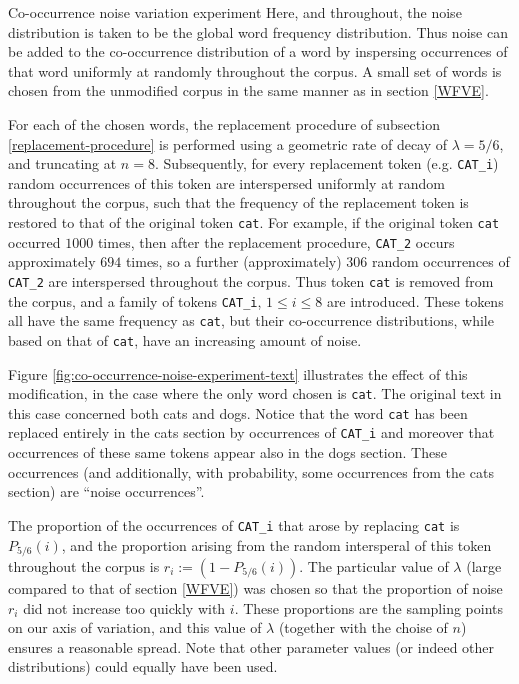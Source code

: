 \documentclass{article} %
\newcommand{\word}[1]{\texttt{#1}}
\begin{document}
\begin{section}{Co-occurrence noise variation experiment}\label{CNVE}
Here, and throughout, the noise distribution is taken to be the global word frequency distribution.
Thus noise can be added to the co-occurrence distribution of a word by inspersing occurrences of that word uniformly at randomly throughout the corpus.
A small set of words is chosen from the unmodified corpus in the same manner as in section \ref{WFVE}.

For each of the chosen words, the replacement procedure of subsection \ref{replacement-procedure} is performed using a geometric rate of decay of $\lambda = 5/6$, and truncating at $n=8$.
Subsequently, for every replacement token (e.g. \word{CAT\_i}) random occurrences of this token are interspersed uniformly at random throughout the corpus, such that the frequency of the replacement token is restored to that of the original token \word{cat}.
For example, if the original token \word{cat} occurred $1000$ times, then after the replacement procedure, \word{CAT\_2} occurs approximately $694$ times, so a further (approximately) $306$ random occurrences of \word{CAT\_2} are interspersed throughout the corpus.
Thus token \word{cat} is removed from the corpus, and a family of tokens \word{CAT\_i}, $1 \leqslant i \leqslant 8$ are introduced.
These tokens all have the same frequency as \word{cat}, but their co-occurrence distributions, while based on that of \word{cat}, have an increasing amount of noise.

Figure \ref{fig:co-occurrence-noise-experiment-text} illustrates the effect of this modification, in the case where the only word chosen is \word{cat}.
The original text in this case concerned both cats and dogs.
Notice that the word \word{cat} has been replaced entirely in the cats section by occurrences of \word{CAT\_i} and moreover that occurrences of these same tokens appear also in the dogs section. These occurrences (and additionally, with probability, some occurrences from the cats section) are ``noise occurrences''.

The proportion of the occurrences of \word{CAT\_i} that arose by replacing \word{cat} is $P_{5/6}(i)$, and the proportion arising from the random intersperal of this token throughout the corpus is $r_i := (1 - P_{5/6}(i))$.
The particular value of $\lambda$ (large compared to that of section \ref{WFVE}) was chosen so that the proportion of noise $r_i$ did not increase too quickly with $i$.
These proportions are the sampling points on our axis of variation, and this value of $\lambda$ (together with the choise of $n$) ensures a reasonable spread.
Note that other parameter values (or indeed other distributions) could equally have been used.


\end{section}
\end{document}
